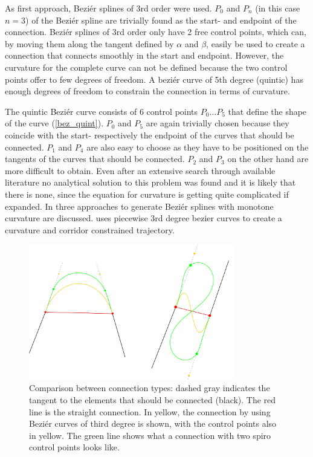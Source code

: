 As first approach, Beziér splines of 3rd order were used. $P_0$ and $P_n$ (in this case $n=3$) of the Beziér spline are trivially found as the start- and endpoint of the connection.  Beziér splines of 3rd order only have 2 free control points, which can, by moving them along the tangent defined by $\alpha$ and $\beta$, easily be used to create a connection that connects smoothly in the start and endpoint. However, the curvature for the complete curve can not be defined because the two control points offer to few degrees of freedom. A beziér curve of 5th degree (quintic) has enough degrees of freedom to constrain the connection in terms of curvature.

The quintic Beziér curve consists of 6 control points $P_0 \ldots P_5$ that define the shape of the curve (\autoref{bez_quint}). $P_0$ and $P_5$ are again trivially chosen because they coincide with the start- respectively the endpoint of the curves that should be connected. $P_1$ and $P_4$ are also easy to choose as they have to be positioned on the tangents of the curves that should be connected. $P_2$ and $P_3$ on the other hand are more difficult to obtain. Even after an extensive search through available literature no analytical solution to this problem was found and it is likely that there is none, since the equation for curvature is getting quite complicated if expanded. In \cite{doi:10.1137/1.9781611971521.ch5} three approaches to generate Beziér splines with monotone curvature are discussed. \cite{choi2010piecewise} uses piecewise 3rd degree bezier curves to create a curvature and corridor constrained trajectory.

\begin{figure}
\centering
\includegraphics[width=0.8\textwidth]{images/smooth/spiro_connect_comparison.pdf}
\caption{Comparison between connection types: dashed gray indicates the tangent to the elements that should be connected (black). The red line is the straight connection. In yellow, the connection by using Beziér curves of third degree is shown, with the control points also in yellow. The green line shows what a connection with two spiro control points looks like.}\label{fig:comp_bez_spiro}
\end{figure}


